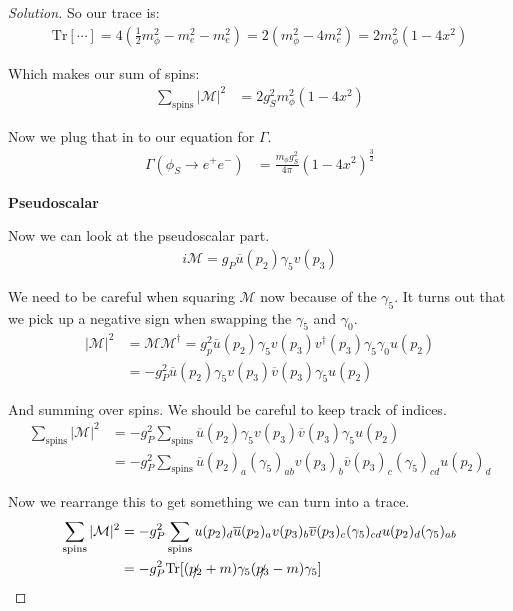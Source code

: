 \documentclass[12pt]{article}
\newenvironment{solution}{\begin{proof}[Solution]}{\end{proof}}
\begin{document}
\begin{solution}
So our trace is:
\begin{align*}
    \text{Tr}[\cdots]=4(\frac{1}{2}m_\phi^2-m_e^2-m_e^2)=2(m_\phi^2-4m_e^2)=2m_\phi^2(1-4x^2)
\end{align*}

Which makes our sum of spins:
\begin{align*}
    \sum_{\text{spins}} |\mathcal{M}|^2&=2g_S^2m_\phi^2(1-4x^2)
\end{align*}

Now we plug that in to our equation for $\Gamma$.
\begin{align*}
    \Gamma(\phi_S\rightarrow e^+e^-)&=\frac{m_\phi g_S^2}{4\pi}(1-4x^2)^\frac{3}{2}
\end{align*}

\textbf{Pseudoscalar}

Now we can look at the pseudoscalar part.
\begin{align*}
    i\mathcal{M}=g_P\overline{u}(p_2)\gamma_5v(p_3)
\end{align*}

We need to be careful when squaring $\mathcal{M}$ now because of the $\gamma_5$. It turns out that we pick up a negative sign when swapping the $\gamma_5$ and $\gamma_0$.
\begin{align*}
    |\mathcal{M}|^2&=\mathcal{M}\mathcal{M}^\dagger=g_p^2 \overline{u}(p_2)\gamma_5 v(p_3) v^\dagger(p_3)\gamma_5 \gamma_0 u(p_2) \\
    &=-g_P^2\overline{u}(p_2)\gamma_5v(p_3)\overline{v}(p_3)\gamma_5u(p_2)
\end{align*}

And summing over spins. We should be careful to keep track of indices.
\begin{align*}
    \sum_{\text{spins}} |\mathcal{M}|^2&=-g_P^2\sum_{\text{spins}}\overline{u}(p_2)\gamma_5v(p_3)\overline{v}(p_3)\gamma_5u(p_2) \\
    &= -g_P^2\sum_{\text{spins}}\overline{u}(p_2)_a(\gamma_5)_{ab}v(p_3)_b \overline{v}(p_3)_c (\gamma_5)_{cd}u(p_2)_d
\end{align*}

Now we rearrange this to get something we can turn into a trace.
\begin{align*}
    \sum_{\text{spins}} |\mathcal{M}|^2&=-g_P^2\sum_{\text{spins}}u(p_2)_d\overline{u}(p_2)_av(p_3)_b \overline{v}(p_3)_c(\gamma_5)_{cd}u(p_2)_d(\gamma_5)_{ab} \\
    &= -g_P^2\text{Tr}[(\slashed{p_2}+m)\gamma_5 (\slashed{p_3}-m)\gamma_5]
\end{align*}


\end{solution}
\end{document}
